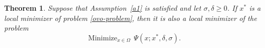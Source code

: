 \documentclass[11pt]{article}
\newcommand{\minimize}{\mathop{\text{Minimize}}}
\newtheorem{theorem}{Theorem}[section]
\begin{document}


\begin{theorem} \label{teo:conv3}
Suppose that Assumption~\ref{a1} is satisfied and let $\sigma, \delta 
\geq 0$. If $x^*$ is a local minimizer of problem \eqref{ovo-problem}, 
then it is also a local minimizer of the problem
\begin{equation} \label{ovo-problem-2}
    \minimize_{x \in \Omega}\, \Psi(x; x^*, \delta, \sigma).
\end{equation}
\end{theorem}
\end{document}
